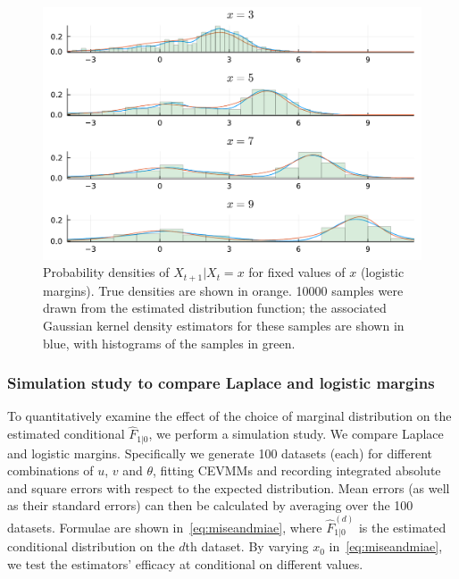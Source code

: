 \documentclass[11pt,twoside,openany]{book}
\numberwithin{Theorem}{chapter}
\numberwithin{Definition}{chapter}
\numberwithin{Lemma}{chapter}
\numberwithin{Algorithm}{chapter}
\numberwithin{equation}{chapter}
\begin{document}
\begin{figure}[htp]
  \centering
  \includegraphics[scale=0.7]{../ht-em/figures/worked_example_logistic_vs_true_resids.pdf
}
  \caption{Probability densities of $X_{t+1}|X_{t}=x$ for fixed values of $x$ (logistic margins).
    True densities are shown in orange. 10000 samples were drawn from the
    estimated distribution function; the associated Gaussian kernel density estimators
    for these samples are shown in blue, with histograms of the samples in green.
   }\label{fig:worked_example_logistic_vs_true_resids}
\end{figure}

\FloatBarrier
\clearpage
\subsubsection{Simulation study to compare Laplace and logistic margins}\label{sec:lap_vs_log}

To quantitatively examine the effect of the choice of marginal distribution
on the estimated conditional $\hat F_{1|0}$, we perform a simulation study.
We compare Laplace and logistic margins. Specifically we generate 100 datasets (each)
for different combinations of $u$, $v$ and $\theta$, fitting CEVMMs and
recording integrated absolute and square errors
with respect to the expected distribution. Mean errors (as well as their standard errors) can then be calculated
by averaging over the 100 datasets. Formulae are shown in~\eqref{eq:miseandmiae},
where $\hat F^{(d)}_{1|0}$ is the estimated conditional distribution on the $d$th dataset.
By varying $x_0$ in~\eqref{eq:miseandmiae}, we test the estimators' efficacy
at conditional on different values.
\end{document}
